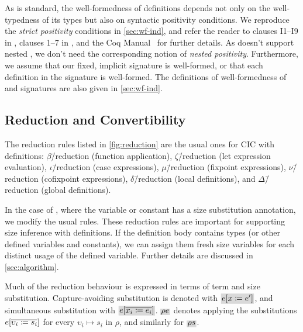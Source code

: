 As is standard, the well-formedness of \coinductive definitions depends not only on the well-typedness of its types but also on syntactic positivity conditions.
We reproduce the \textit{strict positivity} conditions in \autoref{sec:wf-ind}, and refer the reader to clauses I1--I9 in \citet{cic-hat-minus}, clauses 1--7 in \mbox{\citet{cic-hat}}, and the Coq Manual~\citep{coq} for further details.
As \lang doesn't support nested \coinductives,
we don't need the corresponding notion of \textit{nested positivity}.
Furthermore, we assume that our fixed, implicit signature is well-formed,
or that each definition in the signature is well-formed.
The definitions of well-formedness of \coinductives and signatures
are also given in \autoref{sec:wf-ind}.

\subsection{Reduction and Convertibility}

The reduction rules listed in \autoref{fig:reduction} are the usual ones for CIC with definitions:
$\beta$\=/reduction (function application),
$\zeta$\=/reduction (let expression evaluation),
$\iota$\=/reduction (case expressions),
$\mu$\=/reduction (fixpoint expressions),
$\nu$\=/reduction (cofixpoint expressions),
$\delta$\=/reduction (local definitions), and
$\Delta$\=/reduction (global definitions).



In the case of \deltaDeltareduction, where the variable or constant has a size substitution annotation, we modify the usual rules.
These reduction rules are important for supporting size inference with definitions.
If the definition body contains \coinductive types (or other defined variables and constants), we can assign them fresh size variables for each distinct usage of the defined variable.
Further details are discussed in \autoref{sec:algorithm}.

Much of the reduction behaviour is expressed in terms of term and size substitution.
Capture-avoiding substitution is denoted with $\new{\subst{e}{x}{e'}}$,
and simultaneous substitution with $\new{\substvec{e}{x_i}{e_i}}$.
$\new{\rho e}$ denotes applying the substitutions $e [\overline{\upsilon_i \coloneqq s_i}]$ for every $\upsilon_i \mapsto s_i$ in $\rho$,
and similarly for $\new{\rho s}$.

